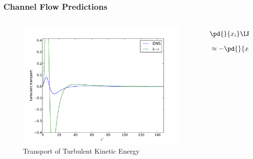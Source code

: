\documentclass{beamer}
\begin{document}
\begin{frame}\frametitle{Channel Flow Predictions}
\begin{columns}[c]
\begin{column}{0.7\textwidth}
\begin{figure}[t]
	\begin{center}
		\includegraphics[width=\textwidth]{Transport.pdf}
	\end{center}
	\caption{Transport of Turbulent Kinetic Energy}
\end{figure}
\end{column}
\hspace{-3em}
\begin{column}{0.3\textwidth}
\begin{align*}
&\pd{}{x_i}\LRp{\frac{1}{2}\overline{u_k'u_k'u_i'}+\overline{p'u_i'}}\\
&\approx-\pd{}{x_i}\LRp{\frac{\nu_T}{\sigma_k}\pd{k}{x_i}}
\end{align*}
\end{column}
\end{columns}
\end{frame}
\end{document}
